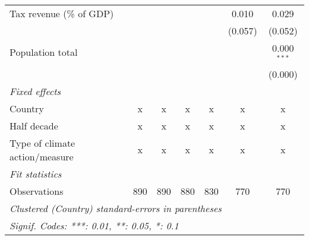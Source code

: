 \begin{tabular}{lcccccc}
   Tax revenue (\% of GDP)                           &         &         &         &                & 0.010          & 0.029\\   
                                                     &         &         &         &                & (0.057)        & (0.052)\\   
   Population total                                  &         &         &         &                &                & 0.000$^{***}$\\   
                                                     &         &         &         &                &                & (0.000)\\   
   \emph{Fixed effects}\\
   Country                                           & x       & x       & x       & x              & x              & x\\  
   Half decade                                       & x       & x       & x       & x              & x              & x\\  
   Type of climate action/measure                    & x       & x       & x       & x              & x              & x\\  
   \midrule \emph{Fit statistics}\\
   Observations                                      & 890     & 890     & 880     & 830            & 770            & 770\\  
   \midrule
   \multicolumn{7}{l}{\emph{Clustered (Country) standard-errors in parentheses}}\\
   \multicolumn{7}{l}{\emph{Signif. Codes: ***: 0.01, **: 0.05, *: 0.1}}\\
\end{tabular}
\par\endgroup


